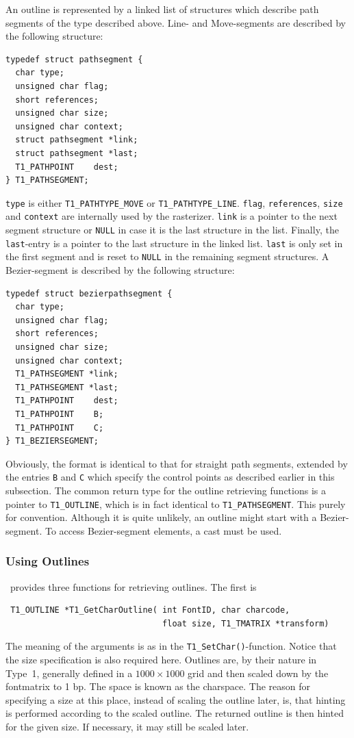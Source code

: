 An outline is represented by a linked list of structures which describe path
segments of the type described above.
Line- and Move-segments are described by the following structure:
\begin{verbatim}
typedef struct pathsegment {  
  char type;                
  unsigned char flag;       
  short references;         
  unsigned char size;       
  unsigned char context;    
  struct pathsegment *link; 
  struct pathsegment *last; 
  T1_PATHPOINT    dest;     
} T1_PATHSEGMENT;
\end{verbatim}
\verb+type+ is either \verb+T1_PATHTYPE_MOVE+ or
\verb+T1_PATHTYPE_LINE+. \verb+flag+, \verb+references+, \verb+size+ and
\verb+context+ are internally used by the rasterizer. \verb+link+ is a pointer
to the next segment structure or \verb+NULL+ in case it is the last structure
in the list. Finally, the \verb+last+-entry is a pointer to
the last structure in the linked list. \verb+last+ is only set in the first
segment and is reset to \verb+NULL+ in the remaining segment structures. 
A Bezier-segment is described by the following structure:
\begin{verbatim}
typedef struct bezierpathsegment {
  char type;              
  unsigned char flag;     
  short references;       
  unsigned char size;     
  unsigned char context;  
  T1_PATHSEGMENT *link;   
  T1_PATHSEGMENT *last;   
  T1_PATHPOINT    dest;   
  T1_PATHPOINT    B;      
  T1_PATHPOINT    C;      
} T1_BEZIERSEGMENT;
\end{verbatim}
Obviously, the format is identical to that for straight path segments, extended
by the entries \verb+B+ and \verb+C+ which specify the control points as
described earlier in this subsection.
The common return type for the outline retrieving functions is a pointer to 
\verb+T1_OUTLINE+, which is in fact identical to \verb+T1_PATHSEGMENT+. This
purely for convention. Although it is quite unlikely, an outline might start
with a Bezier-segment. To access Bezier-segment elements, a cast must be used.


\subsubsection{Using Outlines}
\label{usingoutlines}%
\tonelib\ provides three functions for retrieving outlines. The first is  
\precorr
\begin{verbatim}
 T1_OUTLINE *T1_GetCharOutline( int FontID, char charcode,
                                float size, T1_TMATRIX *transform)
\end{verbatim}\postcorr
The meaning of the arguments is as in the \verb+T1_SetChar()+-function. 
Notice that the size specification is also required here. Outlines are, by
their nature in Type~1, generally defined in a $1000\times 1000$ grid and then
scaled down by the fontmatrix to 1 bp. The space is known as the
charspace. The reason for specifying a size at this place, instead of scaling
the outline later, is, that hinting is performed according to the scaled
outline. The returned outline is then hinted for the given size. If necessary,
it may still be scaled later.

